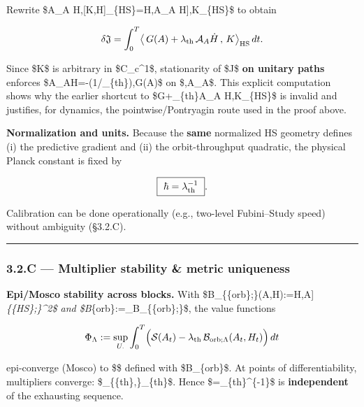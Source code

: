 \documentclass[
]{article}
\numberwithin{equation}{section}
\begin{document}
Rewrite \$\langle \mathcal A\_A
H,{[}K,H{]}\rangle\_\{\rm HS\}=\langle{[}H,\mathcal A\_A
H{]},K\rangle\_\{\rm HS\}\$ to obtain

\[
\delta\mathfrak J=\int_0^T\!\big\langle\,G(A)+\lambda_{\rm th}\,\mathcal A_A\dot H\,,\,K\big\rangle_{\rm HS}\,dt.
\]

Since \$K\$ is arbitrary in \$C\_c\^{}1\$, stationarity of
\$\mathfrak J\$ \textbf{on unitary paths} enforces
\$\mathcal A\_A\dot H=-(1/\lambda\_\{\rm th\}),G(A)\$ on
\$,\mathcal A\_A\$. This explicit computation shows why the
earlier shortcut to \$\langle G+\lambda\_\{\rm th\}\mathcal A\_A
H,K\rangle\_\{\rm HS\}\$ is invalid and justifies, for dynamics, the
pointwise/Pontryagin route used in the proof above.

\textbf{Normalization and units.} Because the \textbf{same} normalized
HS geometry defines (i) the predictive gradient and (ii) the
orbit-throughput quadratic, the physical Planck constant is fixed by

\[
\boxed{\ \hbar=\lambda_{\rm th}^{-1}\ }.
\]

Calibration can be done operationally (e.g., two-level Fubini--Study
speed) without ambiguity (§3.2.C).

\begin{center}\rule{0.5\linewidth}{0.5pt}\end{center}

\hypertarget{c-multiplier-stability-metric-uniqueness}{%
\subsubsection{3.2.C --- Multiplier stability \& metric
uniqueness}\label{c-multiplier-stability-metric-uniqueness}}

\textbf{Epi/Mosco stability across blocks.} With
\$\mathcal B\_\{\{\rm orb\};\Lambda\}(A,H):=\textbar{[}H,A{]}\textbar{}\emph{\{\{\rm HS\};\Lambda\}\^{}2\$
and
\$\mathcal B}\{\rm orb\}:=\sup\_\Lambda\mathcal B\_\{\{\rm orb\};\Lambda\}\$,
the value functions

\[
\Phi_\Lambda:=\sup_{U_\cdot}\int_0^T\!\Big(\mathcal S(A_t)-\lambda_{\rm th}\,\mathcal B_{{\rm orb};\Lambda}(A_t,H_t)\Big)\,dt
\]

epi-converge (Mosco) to \$\Phi\$ defined with
\$\mathcal B\_\{\rm orb\}\$. At points of differentiability, multipliers
converge: \$\lambda\_\{\{\rm th\},\Lambda\}\to\lambda\_\{\rm th\}\$.
Hence \$\hbar=\lambda\_\{\rm th\}\^{}\{-1\}\$ is \textbf{independent} of
the exhausting sequence.
\end{document}
